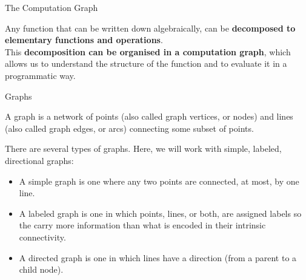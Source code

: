 %
%

\begin{frame}[t]{The Computation Graph} 

    Any function that can be written down algebraically, 
    can be {\bf decomposed to elementary functions and operations}.\\
    \vspace{0.2cm}
    This {\bf decomposition can be organised in a \gls{computation graph}},
    which allows us to understand the structure of the function and
    to evaluate it in a programmatic way.\\
    \vspace{0.2cm}
    
    \begin{blockexample}{Graphs}
    {\small
    A graph is a network of points (also called graph vertices, or nodes)
    and lines (also called graph edges, or arcs) connecting some subset of points.
    
    There are several types of graphs.
    Here, we will work with simple, labeled, directional graphs:
    \begin{itemize}
        \scriptsize
        \item 
        A simple graph is one where any two points are
        connected, at most, by one line. 
        \item
        A labeled graph is one in which points, lines, or both, are assigned  labels so 
        the carry more information than what is encoded in their intrinsic connectivity.
        \item
        A directed graph is one in which lines have a direction (from a parent to a child node).
    \end{itemize}
    }
    \end{blockexample}
    
\end{frame}
